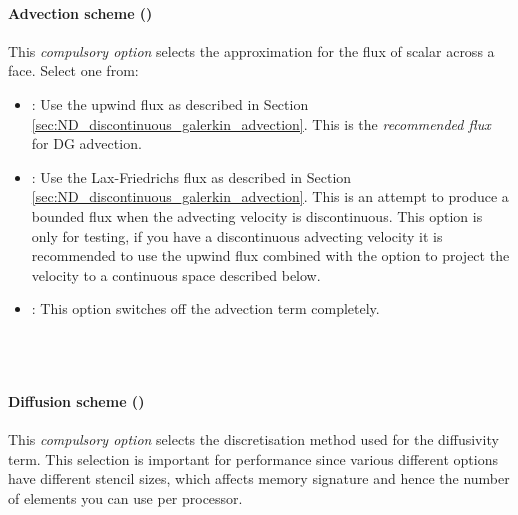 \paragraph{Advection scheme ()} This
\emph{compulsory option} selects the approximation for the flux of
scalar across a face. Select one from:
\begin{itemize}
\item {}: Use the upwind flux as described in Section
  \ref{sec:ND_discontinuous_galerkin_advection}. This is the
  \emph{recommended flux} for DG advection.
\item {}: Use the Lax-Friedrichs flux as described in
  Section \ref{sec:ND_discontinuous_galerkin_advection}. This is an
  attempt to produce a bounded flux when the advecting velocity is
  discontinuous. This option is only for testing, if you have a
  discontinuous advecting velocity it is recommended to use the upwind
  flux combined with the option to project the velocity to a
  continuous space described below.
\item {}: This option switches off the advection term completely.
\end{itemize}

 \\
 \\

\paragraph{Diffusion scheme ()} 
This \emph{compulsory option} selects the discretisation method used
for the diffusivity term. This selection is important for performance
since various different options have different stencil sizes, which
affects memory signature and hence the number of elements you can use
per processor.

